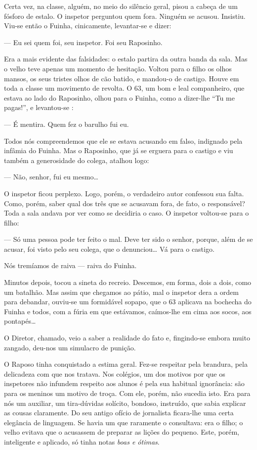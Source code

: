 Certa vez, na classe, alguém, no meio do silêncio geral, pisou a cabeça
de um fósforo de estalo. O inspetor perguntou quem fora. Ninguém se
acusou. Insistiu. Viu-se então o Fuinha, cinicamente, levantar-se e
dizer:

--- Eu sei quem foi, seu inspetor. Foi seu Raposinho.

Era a mais evidente das falsidades: o estalo partira da outra banda da
sala. Mas o velho teve apenas um momento de hesitação. Voltou para o
filho os olhos mansos, os seus tristes olhos de cão batido, e mandou-o
de castigo. Houve em toda a classe um movimento de revolta. O 63, um bom
e leal companheiro, que estava ao lado do Raposinho, olhou para o
Fuinha, como a dizer-lhe ``Tu me pagas!'', e levantou-se :

--- É mentira. Quem fez o barulho fui eu.

Todos nós compreendemos que ele se estava acusando em falso, indignado
pela infâmia do Fuinha. Mas o Raposinho, que já se erguera para o
castigo e viu também a generosidade do colega, atalhou logo:

--- Não, senhor, fui eu mesmo\ldots{}

O inspetor ficou perplexo. Logo, porém, o verdadeiro autor confessou sua
falta. Como, porém, saber qual dos três que se acusavam fora, de fato, o
responsável? Toda a sala andava por ver como se decidiria o caso. O
inspetor voltou-se para o filho:

--- Só uma pessoa pode ter feito o mal. Deve ter sido o senhor, porque,
além de se acusar, foi visto pelo seu colega, que o denunciou\ldots{} Vá para
o castigo.

Nós tremíamos de raiva --- raiva do Fuinha.

Minutos depois, tocou a sineta do recreio. Descemos, em forma, dois a
dois, como um batalhão. Mas assim que chegamos ao pátio, mal o inspetor
dera a ordem para debandar, ouviu-se um formidável sopapo, que o 63
aplicava na bochecha do Fuinha e todos, com a fúria em que estávamos,
caímos-lhe em cima aos socos, aos pontapés\ldots{}

O Diretor, chamado, veio a saber a realidade do fato e, fingindo-se
embora muito zangado, deu-nos um simulacro de punição.

O Raposo tinha conquistado a estima geral. Fez-se respeitar pela
brandura, pela delicadeza com que nos tratava. Nos colégios, um dos
motivos por que os inspetores não infundem respeito aos alunos é pela
sua habitual ignorância: são para os meninos um motivo de troça. Com
ele, porém, não sucedia isto. Era para nós um auxiliar, um tira-dúvidas
solícito, bondoso, instruído, que sabia explicar as cousas claramente.
Do seu antigo ofício de jornalista ficara-lhe uma certa elegância de
linguagem. Se havia um que raramente o consultava: era o filho; o velho
evitava que o acusassem de preparar as lições do pequeno. Este, porém,
inteligente e aplicado, só tinha notas \emph{boas e ótimas}.

